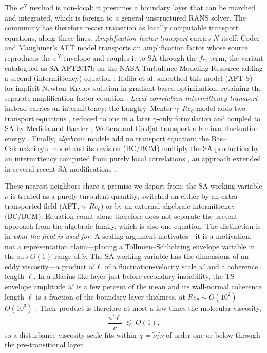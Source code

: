 \documentclass[journal]{new-aiaa}
\begin{document}
The $e^N$ method is non-local: it presumes a boundary layer that can be marched and
integrated, which is foreign to a general unstructured RANS solver. The community
has therefore recast transition as locally computable transport equations,
along three lines. \emph{Amplification factor transport} carries $N$ itself: Coder
and Maughmer's AFT model transports an amplification factor whose source reproduces
the $e^N$ envelope and couples it to SA through the $f_{t2}$ term, the variant
catalogued as SA-AFT2017b on the NASA Turbulence Modeling Resource adding a second
(intermittency) equation \cite{coder_maughmer_2014, nasa_tmr}; Halila et al.
smoothed this model (AFT-S) for implicit Newton--Krylov solution in
gradient-based optimization, retaining the separate amplification-factor equation
\cite{halila_2022}. \emph{Local-correlation intermittency transport} instead carries
an intermittency: the Langtry--Menter $\gamma$--$Re_\theta$ model adds two transport
equations \cite{menter_langtry_2006, langtry_menter_2009}, reduced to one in a later
$\gamma$-only formulation \cite{menter_gamma_2015} and coupled to SA by Medida and
Baeder \cite{medida_baeder_2011}; Walters and Cokljat transport a
laminar-fluctuation energy \cite{walters_cokljat_2008}. Finally, \emph{algebraic}
models add no transport equation: the Bas--Cakmakcioglu model and its
revision (BC/BCM) multiply the SA production by an intermittency computed from
purely local correlations \cite{cakmakcioglu_2018, cakmakcioglu_2020}, an approach
extended in several recent SA modifications \cite{rahman_2024, crivellini_2023}.

These nearest neighbors share a premise we depart from: the SA working
variable $\tilde\nu$ is treated as a purely turbulent quantity, switched on either
by an extra transported field (AFT, $\gamma$--$Re_\theta$) or by an external
algebraic intermittency (BC/BCM). Equation count alone therefore does not separate
the present approach from the algebraic family, which is also one-equation. The
distinction is in \emph{what the field is used for}. A scaling argument
motivates---it is a motivation, not a representation claim---placing a
Tollmien--Schlichting envelope variable in the sub-$O(1)$ range of
$\tilde\nu$. The SA working
variable has the dimensions of an eddy viscosity---a product $u'\ell$ of a
fluctuation-velocity scale $u'$ and a coherence length $\ell$. In a Blasius-like
layer just before secondary instability, the TS-envelope amplitude $u'$ is a few
percent of the mean and its wall-normal coherence length $\ell$ is a fraction of
the boundary-layer thickness, at $Re_\theta\!\sim\!O(10^2)$--$O(10^3)$
\cite{schmid_henningson_2001,abu_ghannam_shaw_1980}. Their product is therefore
at most a few times the molecular viscosity,
\begin{equation}
  \frac{u'\ell}{\nu}\;\lesssim\;O(1),
  \label{eq:scaling}
\end{equation}
so a disturbance-viscosity scale fits within $\chi\!=\!\tilde\nu/\nu$ of
order one or below through the pre-transitional layer.
\end{document}
